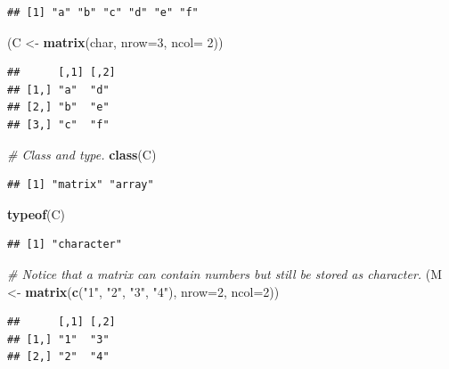 \documentclass[
]{book}
\newenvironment{Shaded}{\begin{snugshade}}{\end{snugshade}}
\newcommand{\AttributeTok}[1]{\textcolor[rgb]{0.13,0.29,0.53}{#1}}
\newcommand{\CommentTok}[1]{\textcolor[rgb]{0.56,0.35,0.01}{\textit{#1}}}
\newcommand{\DecValTok}[1]{\textcolor[rgb]{0.00,0.00,0.81}{#1}}
\newcommand{\FunctionTok}[1]{\textcolor[rgb]{0.13,0.29,0.53}{\textbf{#1}}}
\newcommand{\NormalTok}[1]{#1}
\newcommand{\OtherTok}[1]{\textcolor[rgb]{0.56,0.35,0.01}{#1}}
\newcommand{\StringTok}[1]{\textcolor[rgb]{0.31,0.60,0.02}{#1}}
\begin{document}
\begin{verbatim}
## [1] "a" "b" "c" "d" "e" "f"
\end{verbatim}

\begin{Shaded}
\begin{Highlighting}[]
\NormalTok{(C }\OtherTok{\textless{}{-}} \FunctionTok{matrix}\NormalTok{(char, }\AttributeTok{nrow=}\DecValTok{3}\NormalTok{, }\AttributeTok{ncol=} \DecValTok{2}\NormalTok{))}
\end{Highlighting}
\end{Shaded}

\begin{verbatim}
##      [,1] [,2]
## [1,] "a"  "d" 
## [2,] "b"  "e" 
## [3,] "c"  "f"
\end{verbatim}

\begin{Shaded}
\begin{Highlighting}[]
\CommentTok{\# Class and type.}
\FunctionTok{class}\NormalTok{(C)}
\end{Highlighting}
\end{Shaded}

\begin{verbatim}
## [1] "matrix" "array"
\end{verbatim}

\begin{Shaded}
\begin{Highlighting}[]
\FunctionTok{typeof}\NormalTok{(C)}
\end{Highlighting}
\end{Shaded}

\begin{verbatim}
## [1] "character"
\end{verbatim}

\begin{Shaded}
\begin{Highlighting}[]
\CommentTok{\# Notice that a matrix can contain numbers but still be stored as character.}
\NormalTok{(M }\OtherTok{\textless{}{-}} \FunctionTok{matrix}\NormalTok{(}\FunctionTok{c}\NormalTok{(}\StringTok{"1"}\NormalTok{, }\StringTok{"2"}\NormalTok{, }\StringTok{"3"}\NormalTok{, }\StringTok{"4"}\NormalTok{), }\AttributeTok{nrow=}\DecValTok{2}\NormalTok{, }\AttributeTok{ncol=}\DecValTok{2}\NormalTok{))}
\end{Highlighting}
\end{Shaded}

\begin{verbatim}
##      [,1] [,2]
## [1,] "1"  "3" 
## [2,] "2"  "4"
\end{verbatim}
\end{document}
